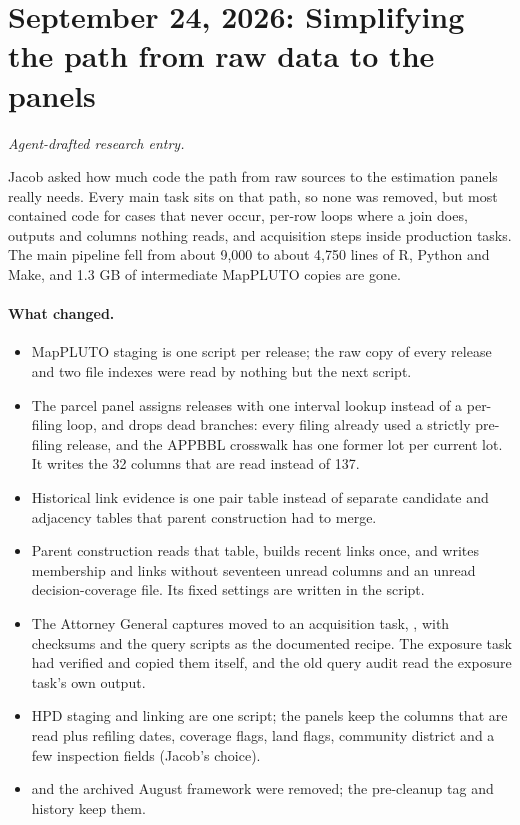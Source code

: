 \clearpage
\section*{September 24, 2026: Simplifying the path from raw data to the panels}
\textit{Agent-drafted research entry.}

Jacob asked how much code the path from raw sources to the estimation panels
really needs. Every main task sits on that path, so none was removed, but most
contained code for cases that never occur, per-row loops where a join does,
outputs and columns nothing reads, and acquisition steps inside production
tasks. The main pipeline fell from about 9,000 to about 4,750 lines of R,
Python and Make, and 1.3 GB of intermediate MapPLUTO copies are gone.

\paragraph{What changed.}
\begin{itemize}
\item MapPLUTO staging is one script per release; the raw copy of every
release and two file indexes were read by nothing but the next script.
\item The parcel panel assigns releases with one interval lookup instead of a
per-filing loop, and drops dead branches: every filing already used a strictly
pre-filing release, and the APPBBL crosswalk has one former lot per current
lot. It writes the 32 columns that are read instead of 137.
\item Historical link evidence is one pair table instead of separate candidate
and adjacency tables that parent construction had to merge.
\item Parent construction reads that table, builds recent links once, and
writes membership and links without seventeen unread columns and an unread
decision-coverage file. Its fixed settings are written in the script.
\item The Attorney General captures moved to an acquisition task,
, with checksums and the query scripts as the
documented recipe. The exposure task had verified and copied them itself, and
the old query audit read the exposure task's own output.
\item HPD staging and linking are one script; the panels keep the columns
that are read plus refiling dates, coverage flags, land flags, community
district and a few inspection fields (Jacob's choice).
\item {} and the archived August framework were removed; the
pre-cleanup tag and history keep them.
\end{itemize}


